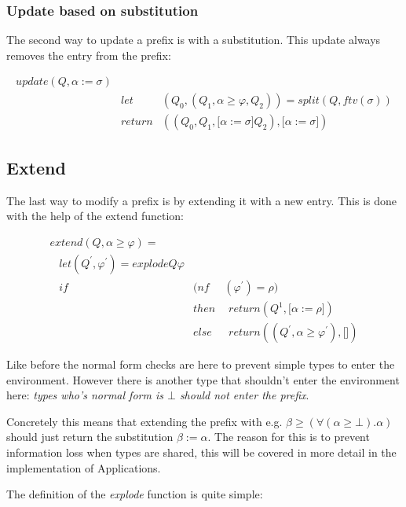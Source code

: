 \subsubsection{Update based on substitution}
The second way to update a prefix is with a substitution. This update always removes the entry from the prefix:

\begin{eqnarray*}
update(Q, \alpha := \sigma) \\
\hspace{10pt} &let & (Q_0, (Q_1, \alpha \geq \varphi, Q_2)) = split(Q, ftv(\sigma)) \\
              &return& ((Q_0, Q_1, \lbrack \alpha := \sigma \rbrack Q_2), \lbrack \alpha := \sigma \rbrack)
\end{eqnarray*}
\subsection{Extend}
The last way to modify a prefix is by extending it with a new entry. This is done with the help of the extend function:

\begin{eqnarray*}
extend(Q,\alpha \geq \varphi) = \\
\hspace{10pt} let (Q^{'}, \varphi^{'}) = explode Q \varphi \\
\hspace{10pt} if &(nf&(\varphi^{'}) = \rho) \\
                 &then& \hspace{5pt} return (Q^{1}, \lbrack \alpha := \rho \rbrack) \\
                 &else& \hspace{5pt} return ((Q^{'}, \alpha \geq \varphi^{'}),\lbrack \rbrack)
\end{eqnarray*}

Like before the normal form checks are here to prevent simple types to enter the environment. However there is another type that shouldn't enter the environment here: \emph{types who's normal form is $\bot$ should not enter the prefix}. 

Concretely this means that extending the prefix with e.g. $\beta \geq (\forall(\alpha \geq \bot).\alpha)$ should just return the substitution $\beta := \alpha$. The reason for this is to prevent information loss when types are shared, this will be covered in more detail in the implementation of Applications.

The definition of the \emph{explode} function is quite simple:

